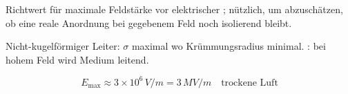 \begin{runintext}
Richtwert für maximale Feldstärke vor elektrischer ; nützlich, um abzuschätzen, ob eine reale Anordnung bei gegebenem Feld noch isolierend bleibt.
\end{runintext}
\begin{runintext}
Nicht-kugelförmiger Leiter: $\sigma$ maximal wo Krümmungsradius minimal. : bei hohem Feld wird Medium leitend.
\end{runintext}
\begin{formulabox}
\[ E_{\max} \approx 3\times 10^6\,\si{V/m} = 3\,\si{MV/m} \quad \text{trockene Luft} \]
\end{formulabox}

